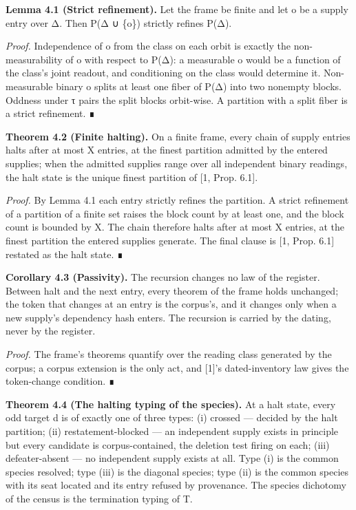 \documentclass[10pt,twocolumn]{article}
\begin{document}
\textbf{Lemma 4.1 (Strict refinement).} Let the frame be finite and let
o be a supply entry over Δ. Then P(Δ ∪ \{o\}) strictly refines P(Δ).

\emph{Proof.} Independence of o from the class on each orbit is exactly
the non-measurability of o with respect to P(Δ): a measurable o would be
a function of the class's joint readout, and conditioning on the class
would determine it. Non-measurable binary o splits at least one fiber of
P(Δ) into two nonempty blocks. Oddness under τ pairs the split blocks
orbit-wise. A partition with a split fiber is a strict refinement. ∎

\textbf{Theorem 4.2 (Finite halting).} On a finite frame, every chain of
supply entries halts after at most \textbar X\textbar{} entries, at the
finest partition admitted by the entered supplies; when the admitted
supplies range over all independent binary readings, the halt state is
the unique finest partition of {[}1, Prop. 6.1{]}.

\emph{Proof.} By Lemma 4.1 each entry strictly refines the partition. A
strict refinement of a partition of a finite set raises the block count
by at least one, and the block count is bounded by \textbar X\textbar.
The chain therefore halts after at most \textbar X\textbar{} entries, at
the finest partition the entered supplies generate. The final clause is
{[}1, Prop. 6.1{]} restated as the halt state. ∎

\textbf{Corollary 4.3 (Passivity).} The recursion changes no law of the
register. Between halt and the next entry, every theorem of the frame
holds unchanged; the token that changes at an entry is the corpus's, and
it changes only when a new supply's dependency hash enters. The
recursion is carried by the dating, never by the register.

\emph{Proof.} The frame's theorems quantify over the reading class
generated by the corpus; a corpus extension is the only act, and
{[}1{]}'s dated-inventory law gives the token-change condition. ∎

\textbf{Theorem 4.4 (The halting typing of the species).} At a halt
state, every odd target d is of exactly one of three types: (i) crossed
--- decided by the halt partition; (ii) restatement-blocked --- an
independent supply exists in principle but every candidate is
corpus-contained, the deletion test firing on each; (iii)
defeater-absent --- no independent supply exists at all. Type (i) is the
common species resolved; type (iii) is the diagonal species; type (ii)
is the common species with its seat located and its entry refused by
provenance. The species dichotomy of the census is the termination
typing of T.
\end{document}
